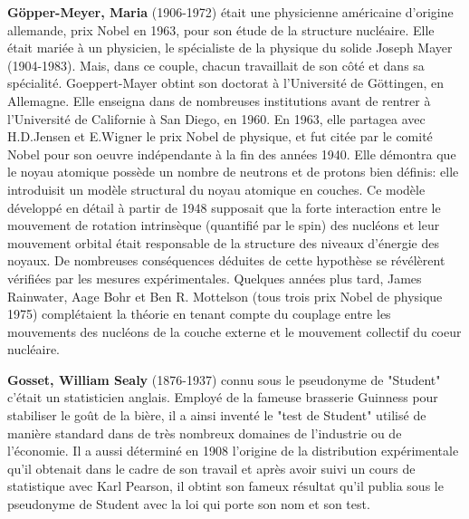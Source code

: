 \textbf{Göpper-Meyer, Maria} (1906-1972) était une physicienne américaine d'origine allemande, prix Nobel en 1963, pour son étude de la structure nucléaire. Elle était mariée à un physicien, le spécialiste de la physique du solide Joseph Mayer (1904-1983). Mais, dans ce couple, chacun travaillait de son côté et dans sa spécialité. Goeppert-Mayer obtint son doctorat à l'Université de Göttingen, en Allemagne. Elle enseigna dans de nombreuses institutions avant de rentrer à l'Université de Californie à San Diego, en 1960. En 1963, elle partagea avec H.D.Jensen et E.Wigner le prix Nobel de physique, et fut citée par le comité Nobel pour son oeuvre indépendante à la fin des années 1940. Elle démontra que le noyau atomique possède un nombre de neutrons et de protons bien définis: elle introduisit un modèle structural du noyau atomique en couches. Ce modèle développé en détail à partir de 1948 supposait que la forte interaction entre le mouvement de rotation intrinsèque (quantifié par le spin) des nucléons et leur mouvement orbital était responsable de la structure des niveaux d'énergie des noyaux. De nombreuses conséquences déduites de cette hypothèse se révélèrent vérifiées par les mesures expérimentales. Quelques années plus tard, James Rainwater, Aage Bohr et Ben R. Mottelson (tous trois prix Nobel de physique 1975) complétaient la théorie en tenant compte du couplage entre les mouvements des nucléons de la couche externe et le mouvement collectif du coeur nucléaire.

\textbf{Gosset, William Sealy} (1876-1937) connu sous le pseudonyme de "Student" c'était un statisticien anglais. Employé de la fameuse brasserie Guinness pour stabiliser le goût de la bière, il a ainsi inventé le "test de Student" utilisé de manière standard dans de très nombreux domaines de l'industrie ou de l'économie. Il a aussi déterminé en 1908 l'origine de la distribution  expérimentale qu'il obtenait dans le cadre de son travail et après avoir suivi un cours de statistique avec Karl Pearson, il obtint son fameux résultat qu'il publia sous le pseudonyme de Student avec la loi qui porte son nom et son test.\\

